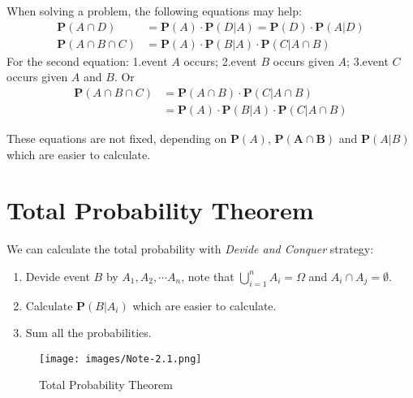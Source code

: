 When solving a problem, the following equations may help:
\begin{align}
    \mathbf{P}(A \cap D) &= \mathbf{P}(A) \cdot \mathbf{P}(D|A) = \mathbf{P}(D) \cdot \mathbf{P}(A|D) \\
    \mathbf{P}(A \cap B \cap C) &= \mathbf{P}(A) \cdot \mathbf{P}(B|A) \cdot \mathbf{P}(C|A \cap B)
\end{align}
For the second equation: 1.event $A$ occurs; 2.event $B$ occurs given $A$; 3.event $C$ occurs given $A$ and $B$. Or
\begin{align*}
    \mathbf{P}(A \cap B \cap C) &= \mathbf{P}(A \cap B) \cdot \mathbf{P}(C | A \cap B) \\ 
    &= \mathbf{P}(A) \cdot \mathbf{P}(B | A) \cdot \mathbf{P}(C | A \cap B)
\end{align*}
\begin{remark}
    These equations are not fixed, depending on $\mathbf{P}(A)$, $\mathbf{P(A \cap B)}$ and $\mathbf{P}(A | B)$ which are easier to calculate.
\end{remark}

\section{Total Probability Theorem}
We can calculate the total probability with \textit{Devide and Conquer} strategy:
\begin{enumerate}
    \item Devide event $B$ by $A_1, A_2, \cdots A_n$, note that $\bigcup_{i=1}^n A_i = \varOmega$ and $A_i \cap A_j = \emptyset$.
    \item Calculate $\mathbf{P}(B | A_i)$ which are easier to calculate.
    \item Sum all the probabilities.
\end{enumerate}
\begin{figure}[H]
    \centering
    \texttt{[image: images/Note-2.1.png]}
    \caption{Total Probability Theorem}
    \label{fig:total-probability}
\end{figure}

